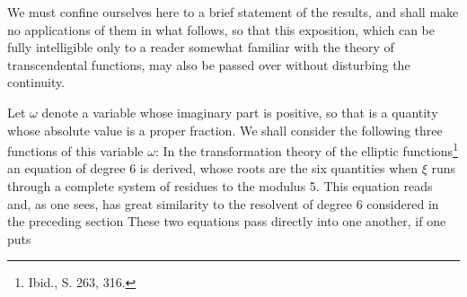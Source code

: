 We must confine ourselves here to a brief statement of the results, and shall make no applications of them in what follows, so that this exposition, which can be fully intelligible only to a reader somewhat familiar with the theory of transcendental functions, may also be passed over without disturbing the continuity.

Let $\omega$ denote a variable whose imaginary part is positive, so that
is a quantity whose absolute value is a proper fraction. We shall consider the following three functions of this variable $\omega$:
In the transformation theory of the elliptic functions\footnote{Ibid., S. 263, 316.} an equation of degree 6 is derived, whose roots are the six quantities
when $\xi$ runs through a complete system of residues to the modulus 5. This equation reads
and, as one sees, has great similarity to the resolvent of degree 6 considered in the preceding section
These two equations pass directly into one another, if one puts
